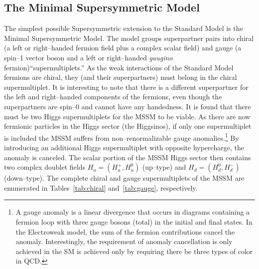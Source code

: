 \subsection{The Minimal Supersymmetric Model}
\label{sec:MSSMAndTaus} The simplest possible Supersymmetric extension to the
Standard Model is the Minimal Supersymmetric Model.  The model groups
superpartner pairs into chiral (a left or right--handed fermion field plus a
complex scalar field) and gauge (a spin--1 vector boson and a left or
right--handed \emph{gaugino} fermion)``supermultiplets.''  As the weak
interactions of the Standard Model fermions are chiral, they (and their
superpartners) must belong in the chiral supermultiplet.  It is interesting to
note that there is a different superpartner for the left and right--handed
components of the fermions, even though the superpartners are spin--0 and cannot
have any handedness. It is found that there must be two Higgs supermultiplets
for the MSSM to be viable.  As there are now fermionic particles in the Higgs
sector (the Higgsinos), if only one supermultiplet is included the MSSM suffers
from non--renormalizable gauge anomalies.\footnote{A gauge anomaly is a linear
divergence that occurs in diagrams containing a fermion loop with three gauge
bosons (total) in the initial and final states.  In the Electroweak model, the
sum of the fermion contributions cancel the anomaly.  Interestingly, the
requirement of anomaly cancellation is only achieved in the SM is achieved only
by requiring there be three types of color in QCD.}  By introducing an
additional Higgs supermultiplet with opposite hypercharge, the anomaly is
canceled. The scalar portion of the MSSM Higgs sector then contains two complex
doublet fields $H_u = (H^+_u, H^0_u)$ (up--type) and $H_d = (H^0_d, H^-_d)$
(down--type).  The complete chiral and gauge supermultiplets of the MSSM are
enumerated in Tables~\ref{tab:chiral} and~\ref{tab:gauge}, respectively.
\renewcommand{\arraystretch}{1.4}
